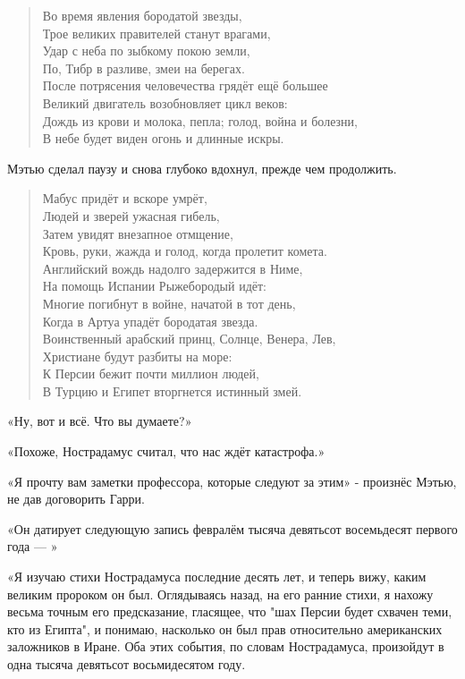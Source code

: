 \documentclass[a5paper, 9pt,
final, openany, twoside=true]{memoir}
\begin{document}
\begin{quote}
Во время явления бородатой звезды,\\
Трое великих правителей станут врагами,\\
Удар с неба по зыбкому покою земли,\\
По, Тибр в разливе, змеи на берегах.\\

После потрясения человечества грядёт ещё большее\\
Великий двигатель возобновляет цикл веков:\\
Дождь из крови и молока, пепла; голод, война и болезни,\\
В небе будет виден огонь и длинные искры.\\
\end{quote}

Мэтью сделал паузу и снова глубоко вдохнул, прежде чем продолжить.\bigskip
\begin{quote}
Мабус придёт и вскоре умрёт,\\
Людей и зверей ужасная гибель,\\
Затем увидят внезапное отмщение,\\
Кровь, руки, жажда и голод, когда пролетит комета.\\

Английский вождь надолго задержится в Ниме,\\
На помощь Испании Рыжебородый идёт:\\
Многие погибнут в войне, начатой в тот день,\\
Когда в Артуа упадёт бородатая звезда.\\

Воинственный арабский принц, Солнце, Венера, Лев,\\
Христиане будут разбиты на море:\\
К Персии бежит почти миллион людей,\\
В Турцию и Египет вторгнется истинный змей.
\end{quote}

«Ну, вот и всё. Что вы думаете?»

«Похоже, Нострадамус считал, что нас ждёт катастрофа.»

«Я прочту вам заметки профессора, которые следуют за этим» - произнёс Мэтью, не дав договорить Гарри.

«Он датирует следующую запись февралём тысяча девятьсот восемьдесят первого года — »\bigskip

«Я изучаю стихи Нострадамуса последние десять лет, и теперь вижу, каким великим пророком он был. Оглядываясь назад, на его ранние стихи, я нахожу весьма точным его предсказание, гласящее, что "шах Персии будет схвачен теми, кто из Египта", и понимаю, насколько он был прав относительно американских заложников в Иране. Оба этих события, по словам Нострадамуса, произойдут в одна тысяча девятьсот восьмидесятом году.
\end{document}
